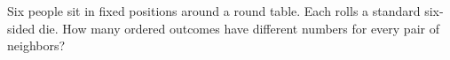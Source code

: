 Six people sit in fixed positions around a round table. Each rolls a standard six-sided die. How many ordered outcomes have different numbers for every pair of neighbors?
